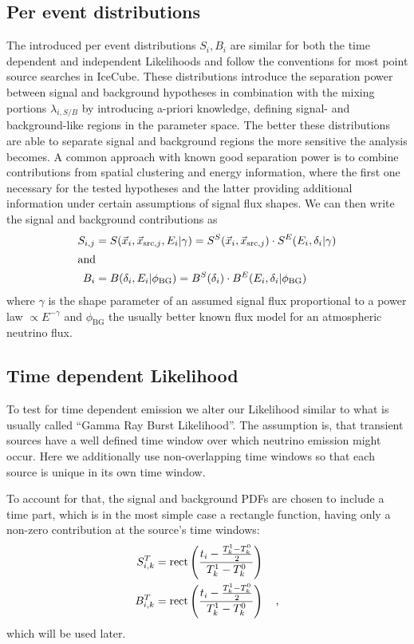 \subsection{Per event distributions}
The introduced per event distributions $S_i, B_i$ are similar for both the time dependent and independent Likelihoods and follow the conventions for most point source searches in IceCube.
These distributions introduce the separation power between signal and background hypotheses in combination with the mixing portions $\lambda_{i,S/B}$ by introducing a-priori knowledge, defining signal- and background-like regions in the parameter space.
The better these distributions are able to separate signal and background regions the more sensitive the analysis becomes.
A common approach with known good separation power is to combine contributions from spatial clustering and energy information, where the first one necessary for the tested hypotheses and the latter providing additional information under certain assumptions of signal flux shapes.
We can then write the signal and background contributions as
\begin{align}
  S_{i,j} &= S(\vec{x}_i, \vec{x}_{\mathrm{src},j}, E_i | \gamma)
    = S^S(\vec{x}_i, \vec{x}_{\mathrm{src},j})\cdot
      S^E(E_i, \delta_i | \gamma) \\
  \intertext{and}
  B_i &= B(\delta_i, E_i | \phi_\mathrm{BG})
    = B^S(\delta_i) \cdot B^E(E_i, \delta_i | \phi_\mathrm{BG})
\end{align}
where $\gamma$ is the shape parameter of an assumed signal flux proportional to a power law $\propto E^{-\gamma}$ and $\phi_\mathrm{BG}$ the usually better known flux model for an atmospheric neutrino flux.

\subsection{Time dependent Likelihood}
To test for time dependent emission we alter our Likelihood similar to what is usually called \enquote{Gamma Ray Burst Likelihood}.
The assumption is, that transient sources have a well defined time window over which neutrino emission might occur.
Here we additionally use non-overlapping time windows so that each source is unique in its own time window.

To account for that, the signal and background PDFs are chosen to include a time part, which is in the most simple case a rectangle function, having only a non-zero contribution at the source's time windows:
\begin{align}
  S_{i,k}^T &= \operatorname{rect}\left(\frac{t_i - \frac{T_k^1-T_k^0}{2}}
                              {T_k^1-T_k^0}\right) \\
  B_{i,k}^T &= \operatorname{rect}\left(\frac{t_i - \frac{T_k^1-T_k^0}{2}}
                              {T_k^1-T_k^0}\right)
  \quad\text{,}
\end{align}
which will be used later.

